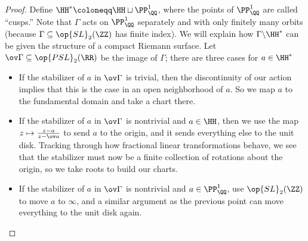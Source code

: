 \documentclass{article}
\begin{document}
\begin{proof}
	Define $\HH^*\coloneqq\HH\sqcup\PP^1_\QQ$, where the points of $\PP^1_\QQ$ are called ``cusps.'' Note that $\Gamma$ acts on $\PP^1_\QQ$ separately and with only finitely many orbits (because $\Gamma\subseteq\op{SL}_2(\ZZ)$ has finite index). We will explain how $\Gamma\backslash\HH^*$ can be given the structure of a compact Riemann surface. Let $\ov\Gamma\subseteq\op{PSL}_2(\RR)$ be the image of $\Gamma$; there are three cases for $a\in\HH^*$
	\begin{itemize}
		\item If the stabilizer of $a$ in $\ov\Gamma$ is trivial, then the discontinuity of our action implies that this is the case in an open neighborhood of $a$. So we map $a$ to the fundamental domain and take a chart there.
		\item If the stabilizer of $a$ in $\ov\Gamma$ is nontrivial and $a\in\HH$, then we use the map $z\mapsto\frac{z-a}{z-\ov a}$ to send $a$ to the origin, and it sends everything else to the unit disk. Tracking through how fractional linear transformations behave, we see that the stabilizer must now be a finite collection of rotations about the origin, so we take roots to build our charts.
		\item If the stabilizer of $a$ in $\ov\Gamma$ is nontrivial and $a\in\PP^1_\QQ$, use $\op{SL}_2(\ZZ)$ to move $a$ to $\infty$, and a similar argument as the previous point can move everything to the unit disk again.
		\qedhere
	\end{itemize}
\end{proof}
\end{document}
